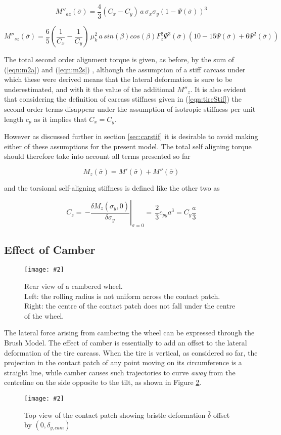 \documentclass[12pt,a4paper]{report}
\newcommand{\figura}[5][htbp]{
\begin{figure}[#1]
\begin{center}
\texttt{[image: \#2]}
\caption{#4}\label{#5}
\end{center}
\end{figure}
}
\newcommand{\eq}[2]{
\begin{equation} \label{#1}
#2
\end{equation}
}
\newcommand{\req}[1]{
(\ref{#1})
}
\begin{document}
\eq{eqn:m2a}{M''_{az}(\bar{\sigma}) = \frac{4}{3} (C_x - C_y) \, a \, \sigma_x \sigma_y \left(1-\Psi(\bar{\sigma}) \right)^3}

\eq{eqn:m2s}{M''_{sz}(\bar{\sigma}) = \frac{6}{5} (\frac{1}{C_x} - \frac{1}{C_y})\, \mu_{k}^2 \, a \, sin(\beta) cos(\beta) F_z^2
				\Psi^3(\bar{\sigma})(10 - 15\Psi(\bar{\sigma}) + 6\Psi^2(\bar{\sigma}))}
				
The total second order alignment torque is given, as before, by the sum of \req{eqn:m2a} and \req{eqn:m2s}, although the assumption of a stiff carcass under which these were derived means that the lateral deformation is sure to be underestimated, and with it the value of the additional $M''_z$. It is also evident that considering the definition of carcass stiffness given in \req{eqn:tireStif} the second order terms disappear under the assumption of isotropic stiffness per unit length $c_p$ as it implies that $C_x = C_y$.

However as discussed further in section \ref{sec:carstif} it is desirable to avoid making either of these assumptions for the present model. The total self aligning torque should therefore take into account all terms presented so far
\eq{eqn:m2}{M_z(\bar{\sigma}) = M'(\bar{\sigma}) + M''(\bar{\sigma})}
and the torsional self-aligning stiffness is defined like the other two as
\eq{eqn:momstif}{ C_z = \, \left. -\frac{\delta M_{z}(\sigma_y,0)}{\delta \sigma_y} \right|_{\sigma=0}  = \, \frac{2}{3} c_{py}a^3 = C_y\frac{a}{3}}


\subsection{Effect of Camber}
\figura{pix/camber_old.jpg}{width=\textwidth}{Rear view of a cambered wheel.\\
Left: the rolling radius is not uniform across the contact patch.\\
Right: the centre of the contact patch does not fall under the centre of the wheel.}{fig:camber0}

The lateral force arising from cambering the wheel can be expressed through the Brush Model.
The effect of camber is essentially to add an offset to the lateral deformation of the tire carcass.
When the tire is vertical, as considered so far, the projection in the contact patch of any point moving on its circumference is a straight line, while camber causes such trajectories to curve \emph{away} from the centreline on the side opposite to the tilt, as shown in Figure \ref{fig:camber1}.
\figura{pix/camber_sven.jpg}{width=14cm}{Top view of the contact patch showing bristle deformation $\bar{\delta}$ offset by $(0,\delta_{y,cam})$}{fig:camber1}
\end{document}
